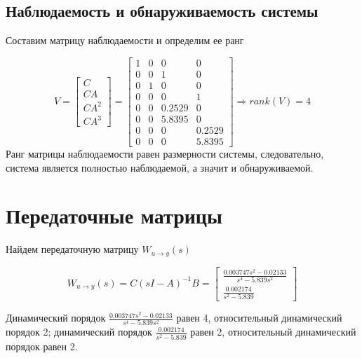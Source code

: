 \subsection{Наблюдаемость и обнаруживаемость системы}

Составим матрицу наблюдаемости и определим ее ранг

\begin{equation}
    V = \begin{bmatrix}
        C \\ CA \\ CA^2\\ CA^3
    \end{bmatrix} = \begin{bmatrix}
           1&         0     &    0    &     0\\
         0   &      0 &   1  &      0\\
         0 &   1 &         0 &        0\\
         0     &    0&         0 &   1\\
         0    &     0 &    0.2529     &    0\\
         0     &    0 &   5.8395    &     0\\
         0     &    0    &     0  &  0.2529\\
         0     &    0    &     0   & 5.8395
    \end{bmatrix} 
    \Rightarrow rank(V) = 4
\end{equation}
Ранг матрицы наблюдаемости равен размерности системы, следовательно, система является полностью наблюдаемой, а значит и обнаруживаемой.

\section{Передаточные матрицы}

Найдем передаточную матрицу $W_{u \to y}(s)$

\begin{equation}
    W_{u \to y} (s) = C \left(sI-A  \right)^{-1}B = \begin{bmatrix}
        \frac{0.003747s^2 -0.02133}{s^4-5.839s^2}\\[2ex]
        \frac{0.002174}{s^2-5.839}
    \end{bmatrix}
\end{equation}

Динамический порядок $ \frac{0.003747s^2 -0.02133}{s^4-5.839s^2}$ равен 4, относительный динамический порядок 2; динамический порядок $\frac{0.002174}{s^2-5.839}$ равен 2, относительный динамический порядок равен 2.

